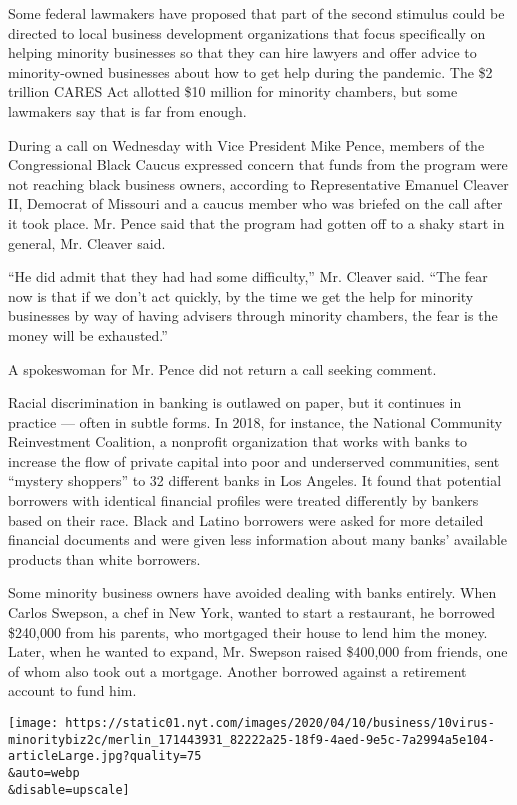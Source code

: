 Some federal lawmakers have proposed that part of the second stimulus
could be directed to local business development organizations that focus
specifically on helping minority businesses so that they can hire
lawyers and offer advice to minority-owned businesses about how to get
help during the pandemic. The \$2 trillion CARES Act allotted \$10
million for minority chambers, but some lawmakers say that is far from
enough.

During a call on Wednesday with Vice President Mike Pence, members of
the Congressional Black Caucus expressed concern that funds from the
program were not reaching black business owners, according to
Representative Emanuel Cleaver II, Democrat of Missouri and a caucus
member who was briefed on the call after it took place. Mr. Pence said
that the program had gotten off to a shaky start in general, Mr. Cleaver
said.

``He did admit that they had had some difficulty,'' Mr. Cleaver said.
``The fear now is that if we don't act quickly, by the time we get the
help for minority businesses by way of having advisers through minority
chambers, the fear is the money will be exhausted.''

A spokeswoman for Mr. Pence did not return a call seeking comment.

Racial discrimination in banking is outlawed on paper, but it continues
in practice --- often in subtle forms. In 2018, for instance, the
National Community Reinvestment Coalition, a nonprofit organization that
works with banks to increase the flow of private capital into poor and
underserved communities, sent ``mystery shoppers'' to 32 different banks
in Los Angeles. It found that potential borrowers with identical
financial profiles were treated differently by bankers based on their
race. Black and Latino borrowers were asked for more detailed financial
documents and were given less information about many banks' available
products than white borrowers.

Some minority business owners have avoided dealing with banks entirely.
When Carlos Swepson, a chef in New York, wanted to start a restaurant,
he borrowed \$240,000 from his parents, who mortgaged their house to
lend him the money. Later, when he wanted to expand, Mr. Swepson raised
\$400,000 from friends, one of whom also took out a mortgage. Another
borrowed against a retirement account to fund him.

\texttt{[image: https://static01.nyt.com/images/2020/04/10/business/10virus-minoritybiz2c/merlin\_171443931\_82222a25-18f9-4aed-9e5c-7a2994a5e104-articleLarge.jpg?quality=75\\\&auto=webp\\\&disable=upscale]}

